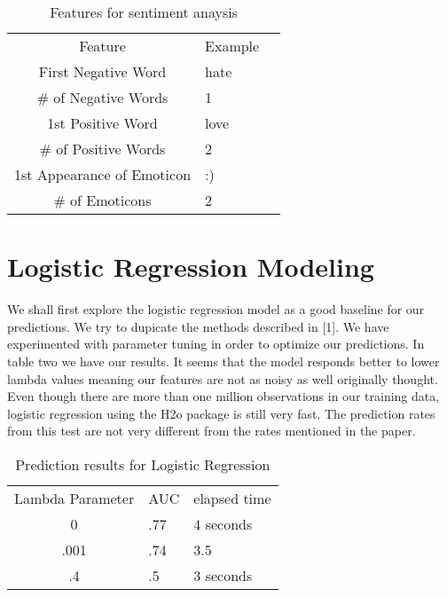 \documentclass[twocolumn,11pt]{asme2ej}
\begin{document}
\begin{table}[t]
\caption{Features for sentiment anaysis}
\begin{center}
\begin{small}
\label{table_ASME}
\begin{tabular}{c l l}
& & \\ %
\hline
 Feature & Example \\
\hline
First Negative Word & hate \\
\# of Negative Words & 1 \\
1st Positive Word & love \\
\# of Positive Words & 2 \\
1st Appearance of Emoticon & :) \\
\# of Emoticons & 2 \\

\hline
\end{tabular}
\end{small}
\end{center}
\end{table}

\section{Logistic Regression Modeling}

We shall first explore the logistic regression model as a good baseline for our predictions. We try to dupicate the methods described in \cite{logistic}[1]. We have experimented with parameter tuning in order to optimize our predictions. In table two we have our results. It seems that the model responds better to lower lambda values meaning our features are not as noisy as well originally thought. Even though there are more than one million observations in our training data, logistic regression using the H2o package is still very fast. The prediction rates from this test are not very different from the rates mentioned in the paper.

\begin{table}[t]
\caption{Prediction results for Logistic Regression}
\begin{center}
\label{table_ASME}
\begin{tabular}{c l l}
& & \\ %
\hline
Lambda Parameter & AUC & elapsed time\\
\hline
0 & .77 & 4 seconds \\
.001 & .74 & 3.5 \\
.4 & .5 & 3 seconds \\
\hline
\end{tabular}
\end{center}
\end{table}
\end{document}
